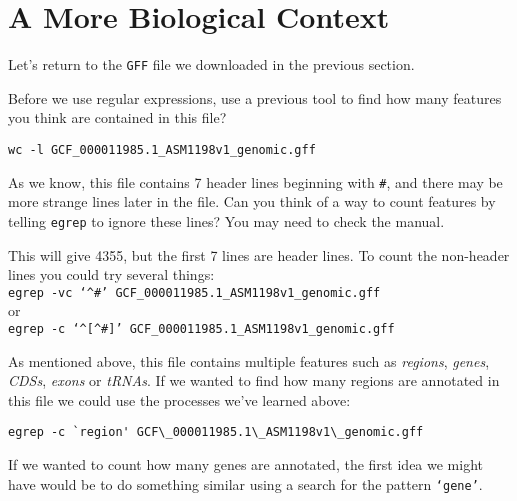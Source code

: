 \section{A More Biological Context}

\begin{steps}
Let's return to the \texttt{GFF} file we downloaded in the previous section.
\end{steps}

\begin{questions}
Before we use regular expressions, use a previous tool to find how many features you think are contained in this file?\\
\begin{answer}
\texttt{wc -l GCF\_000011985.1\_ASM1198v1\_genomic.gff} \\
\end{answer}


As we know, this file contains 7 header lines beginning with \texttt{\#}, and there may be more strange lines later in the file.
Can you think of a way to count features by telling \texttt{egrep} to ignore these lines?
You may need to check the manual.

\begin{answer}
This will give 4355, but the first 7 lines are header lines.
To count the non-header lines you could try several things:\\
\texttt{egrep -vc `\^{}\#' GCF\_000011985.1\_ASM1198v1\_genomic.gff} \\
or\\
\texttt{egrep -c `\^{}[\^{}\#]' GCF\_000011985.1\_ASM1198v1\_genomic.gff} \\
\end{answer}

\end{questions}

As mentioned above, this file contains multiple features such as \textit{regions}, \textit{genes}, \textit{CDSs}, \textit{exons} or \textit{tRNAs}.
If we wanted to find how many regions are annotated in this file we could use the processes we've learned above:
\begin{lstlisting}
egrep -c `region' GCF\_000011985.1\_ASM1198v1\_genomic.gff
\end{lstlisting}

If we wanted to count how many genes are annotated, the first idea we might have would be to do something similar using a search for the pattern \texttt{`gene'}. 


